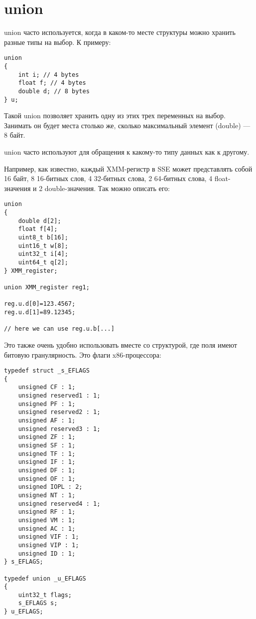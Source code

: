 ﻿\section{union}

union часто используется, когда в каком-то месте структуры можно хранить разные типы на выбор.
К примеру:

\begin{lstlisting}
union
{
	int i; // 4 bytes
	float f; // 4 bytes
	double d; // 8 bytes
} u;
\end{lstlisting}

Такой union позволяет хранить одну из этих трех переменных на выбор. Занимать он будет места столько же,
сколько максимальный элемент (double) --- 8 байт.

union часто используют для обращения к какому-то типу данных как к другому.

Например, как известно, каждый XMM-регистр в SSE может представлять собой 16 байт, 8 16-битных слов,
4 32-битных слова, 2 64-битных слова, 4 float-значения и 2 double-значения. Так можно описать его:

\begin{lstlisting}
union
{
	double d[2];
	float f[4];
	uint8_t b[16];
	uint16_t w[8];
	uint32_t i[4];
	uint64_t q[2];
} XMM_register;

union XMM_register reg1;

reg.u.d[0]=123.4567;
reg.u.d[1]=89.12345;

// here we can use reg.u.b[...]

\end{lstlisting}

Это также очень удобно использовать вместе со структурой, где поля имеют битовую гранулярность.
Это флаги x86-процессора:

\begin{lstlisting}
typedef struct _s_EFLAGS
{
    unsigned CF : 1;
    unsigned reserved1 : 1;
    unsigned PF : 1;
    unsigned reserved2 : 1;
    unsigned AF : 1;
    unsigned reserved3 : 1;
    unsigned ZF : 1;
    unsigned SF : 1;
    unsigned TF : 1;
    unsigned IF : 1;
    unsigned DF : 1;
    unsigned OF : 1;
    unsigned IOPL : 2;
    unsigned NT : 1;
    unsigned reserved4 : 1;
    unsigned RF : 1;
    unsigned VM : 1;
    unsigned AC : 1;
    unsigned VIF : 1;
    unsigned VIP : 1;
    unsigned ID : 1;
} s_EFLAGS;

typedef union _u_EFLAGS
{
    uint32_t flags;
    s_EFLAGS s;
} u_EFLAGS;
\end{lstlisting}


